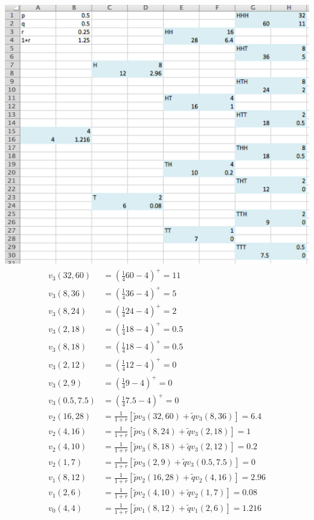 \documentclass[12pt]{article}
\newenvironment{exercise}[2][Exercise]{\begin{trivlist}
		\item[\hskip \labelsep {\bfseries #1}\hskip \labelsep {\bfseries #2.}]}{\end{trivlist}}
\begin{document}
	\begin{exercise}{8}\end{exercise}
	\includegraphics[scale=0.6]{Ex1_8.png}\\
	\begin{align*}
	v_3(32,60) &= (\frac{1}{4}60-4)^+=11\\
	v_3(8,36) &= (\frac{1}{4}36-4)^+=5\\
	v_3(8,24) &= (\frac{1}{4}24-4)^+=2\\
	v_3(2,18) &= (\frac{1}{4}18-4)^+=0.5\\
	v_3(8,18) &= (\frac{1}{4}18-4)^+=0.5\\
	v_3(2,12) &= (\frac{1}{4}12-4)^+=0\\
	v_3(2,9) &= (\frac{1}{4}9-4)^+=0\\
	v_3(0.5,7.5) &= (\frac{1}{4}7.5-4)^+=0\\
	v_2(16,28) &= \frac{1}{1+r}[\tilde{p}v_3(32,60)+\tilde{q}v_3(8,36)] = 6.4\\
	v_2(4,16) &= \frac{1}{1+r}[\tilde{p}v_3(8,24)+\tilde{q}v_3(2,18)] = 1\\
	v_2(4,10) &= \frac{1}{1+r}[\tilde{p}v_3(8,18)+\tilde{q}v_3(2,12)] = 0.2\\
	v_2(1,7) &= \frac{1}{1+r}[\tilde{p}v_3(2,9)+\tilde{q}v_3(0.5,7.5)] = 0\\
	v_1(8,12) &= \frac{1}{1+r}[\tilde{p}v_2(16,28)+\tilde{q}v_2(4,16)] = 2.96\\
	v_1(2,6) &= \frac{1}{1+r}[\tilde{p}v_2(4,10)+\tilde{q}v_2(1,7)] = 0.08\\
	v_0(4,4) &= \frac{1}{1+r}[\tilde{p}v_1(8,12)+\tilde{q}v_1(2,6)] = 1.216
	\end{align*}
\end{document}
